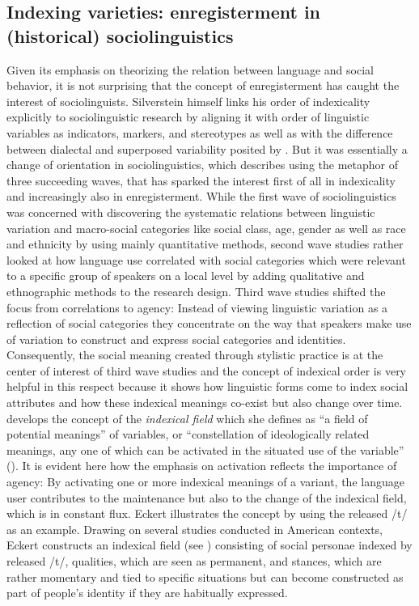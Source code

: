 \subsection{Indexing varieties: enregisterment in (historical) sociolinguistics}
\label{bkm:Ref506884048}\hypertarget{Toc63021212}{}
Given its emphasis on theorizing the relation between language and social behavior, it is not surprising that the concept of enregisterment has caught the interest of sociolinguists. Silverstein himself links his order of indexicality explicitly to sociolinguistic research by aligning it with  order of linguistic variables as indicators, markers, and stereotypes as well as with the difference between dialectal and superposed variability posited by \citet[383--384]{Gumperz1968}. But it was essentially a change of orientation in sociolinguistics, which \citet{Eckert2012} describes using the metaphor of three succeeding waves, that has sparked the interest first of all in indexicality and increasingly also in enregisterment. While the first wave of sociolinguistics was concerned with discovering the systematic relations between linguistic variation and macro-social categories like social class, age, gender as well as race and ethnicity by using mainly quantitative methods, second wave studies rather looked at how language use correlated with social categories which were relevant to a specific group of speakers on a local level by adding qualitative and ethnographic methods to the research design. Third wave studies shifted the focus from correlations to agency: Instead of viewing linguistic variation as a reflection of social categories they concentrate on the way that speakers make use of variation to construct and express social categories and identities. Consequently, the social meaning created through stylistic practice is at the center of interest of third wave studies and the concept of indexical order is very helpful in this respect because it shows how linguistic forms come to index social attributes and how these indexical meanings co-exist but also change over time. \citet{Eckert2008} develops the concept of the \textit{indexical field} which she defines as “a field of potential meanings” of variables, or “constellation of ideologically related meanings, any one of which can  be activated in the situated use of the variable” (\citeyear[454]{Eckert2008}). It is evident here how the emphasis on activation reflects the importance of agency: By activating one or more indexical meanings of a variant, the language user contributes to the maintenance but also to the change of the indexical field, which is in constant flux. Eckert illustrates the concept by using the released /t/ as an example. Drawing on several studies conducted in American contexts, Eckert constructs an indexical field (see ) consisting of social personae indexed by released /t/, qualities, which are seen as permanent, and stances, which are rather momentary and tied to specific situations but can become constructed as part of people’s identity if they are habitually expressed.


